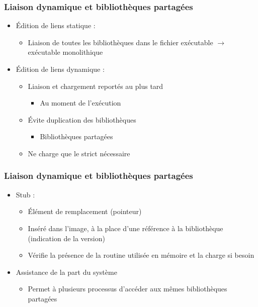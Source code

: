 \begin{frame}
\frametitle{Liaison dynamique et bibliothèques partagées}
\begin{itemize}
\item Édition de liens statique :
\begin{itemize}
\item Liaison de toutes les bibliothèques dans le fichier exécutable $\rightarrow$ exécutable monolithique
\end{itemize}
\item Édition de liens dynamique :
\begin{itemize}
\item Liaison et chargement reportés au plus tard
\begin{itemize}
\item Au moment de l'exécution
\end{itemize}
\item Évite duplication des bibliothèques
\begin{itemize}
\item Bibliothèques partagées
\end{itemize}
\item Ne charge que le strict nécessaire
\end{itemize}
\end{itemize}
\end{frame}


\begin{frame}
\frametitle{Liaison dynamique et bibliothèques partagées}
\begin{itemize}
\item Stub :
\begin{itemize}
\item Élément de remplacement (pointeur)
\item Inséré dans l'image, à la place d'une référence à la bibliothèque (indication de la version)
\item Vérifie la présence de la routine utilisée en mémoire et la charge si besoin
\end{itemize}
\item Assistance de la part du système
\begin{itemize}
\item Permet à plusieurs processus d'accéder aux mêmes bibliothèques partagées
\end{itemize}
\end{itemize}
\end{frame}


